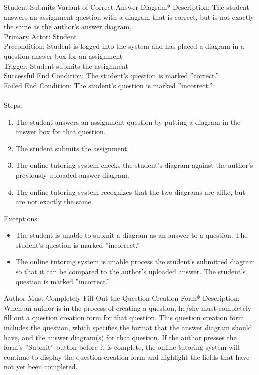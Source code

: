     \begin{section}{Student Submits Variant of Correct Answer Diagram*}
        Description: The student answers an assignment question with a diagram that is correct, but is not exactly the same as the author's answer diagram. \\
        Primary Actor: Student \\
        Precondition: Student is logged into the system and has placed a diagram in a question answer box for an assignment \\ 
        Trigger: Student submits the assignment \\
        Successful End Condition: The student's question is marked ''correct.'' \\
        Failed End Condition: The student's question is marked ''incorrect.'' \\
        \\
        Steps:
        \begin{enumerate}
            \item{The student answers an assignment question by putting a diagram in the answer box for that question.}
            \item{The student submits the assignment.}
            \item{The online tutoring system checks the student's diagram against the author's previously uploaded answer diagram.}
            \item{The online tutoring system recognizes that the two diagrams are alike, but are not exactly the same.}
        \end{enumerate}
        Exceptions:
        \begin{itemize}
            \item{The student is unable to submit a diagram as an answer to a question.  The student's question is marked ''incorrect.''} 
            \item{The online tutoring system is unable process the student's submitted diagram so that it can be compared to the author's uploaded answer.  
            The student's question is marked ''incorrect.''}
        \end{itemize}
    \end{section}
    
    \begin{section}{Author Must Completely Fill Out the Question Creation Form*}
        Description: When an author is in the process of creating a question, he/she must completely
        fill out a question creation form for that question.  This question creation form includes the question, 
        which specifies the format that the answer diagram should have, and the answer diagram(s) for that question. 
        If the author presses the form's ''Submit'' button before it is complete, the online tutoring
        system will continue to display the question creation form and highlight the fields that have 
        not yet been completed.
    \end{section}


    


